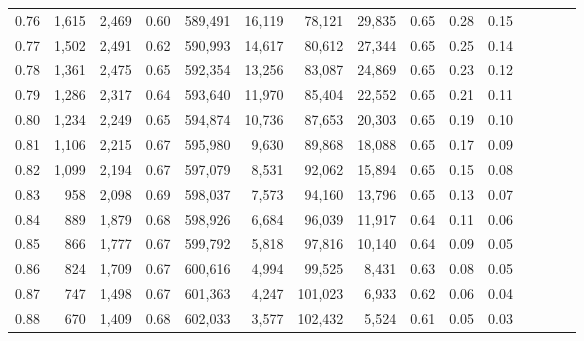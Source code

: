 \begin{tabular}{rrrcrrrrrrrrrrr}
0.76 &   1,615 &  2,469 &                                       0.60 &  589,491 &   16,119 &   78,121 &   29,835 &  0.65 &  0.28 &                         0.15 \\
0.77 &   1,502 &  2,491 &                                       0.62 &  590,993 &   14,617 &   80,612 &   27,344 &  0.65 &  0.25 &                         0.14 \\
0.78 &   1,361 &  2,475 &                                       0.65 &  592,354 &   13,256 &   83,087 &   24,869 &  0.65 &  0.23 &                         0.12 \\
0.79 &   1,286 &  2,317 &                                       0.64 &  593,640 &   11,970 &   85,404 &   22,552 &  0.65 &  0.21 &                         0.11 \\
0.80 &   1,234 &  2,249 &                                       0.65 &  594,874 &   10,736 &   87,653 &   20,303 &  0.65 &  0.19 &                         0.10 \\
0.81 &   1,106 &  2,215 &                                       0.67 &  595,980 &    9,630 &   89,868 &   18,088 &  0.65 &  0.17 &                         0.09 \\
0.82 &   1,099 &  2,194 &                                       0.67 &  597,079 &    8,531 &   92,062 &   15,894 &  0.65 &  0.15 &                         0.08 \\
0.83 &     958 &  2,098 &                                       0.69 &  598,037 &    7,573 &   94,160 &   13,796 &  0.65 &  0.13 &                         0.07 \\
0.84 &     889 &  1,879 &                                       0.68 &  598,926 &    6,684 &   96,039 &   11,917 &  0.64 &  0.11 &                         0.06 \\
0.85 &     866 &  1,777 &                                       0.67 &  599,792 &    5,818 &   97,816 &   10,140 &  0.64 &  0.09 &                         0.05 \\
0.86 &     824 &  1,709 &                                       0.67 &  600,616 &    4,994 &   99,525 &    8,431 &  0.63 &  0.08 &                         0.05 \\
0.87 &     747 &  1,498 &                                       0.67 &  601,363 &    4,247 &  101,023 &    6,933 &  0.62 &  0.06 &                         0.04 \\
0.88 &     670 &  1,409 &                                       0.68 &  602,033 &    3,577 &  102,432 &    5,524 &  0.61 &  0.05 &                         0.03 \\

\end{tabular}
